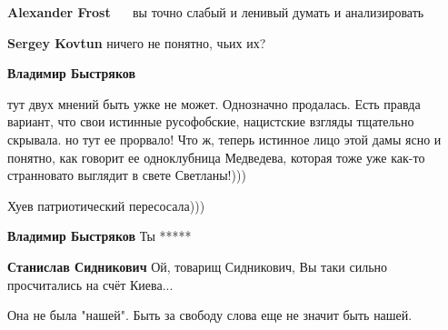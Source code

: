 \begin{itemize}
\begin{itemize}
\textbf{Alexander Frost} 🤣🤣🤣🤣🤣вы точно слабый и ленивый думать и анализировать🤣😎😎😎

 
\textbf{Sergey Kovtun} ничего не понятно, чьих их?

 
\textbf{Владимир Быстряков} 

тут двух мнений быть ужке не может. Однозначно продалась. Есть правда вариант,
что свои истинные русофобские, нацистские взгляды тщательно скрывала. но тут ее
прорвало! Что ж, теперь истинное лицо этой дамы ясно и понятно, как говорит ее
одноклубница Медведева, которая тоже уже как-то странновато выглядит в свете
Светланы!)))


 
Хуев патриотический пересосала)))

 
\textbf{Владимир Быстряков} Ты *****

 
\textbf{Станислав Сидникович} Ой, товарищ Сидникович, Вы таки сильно просчитались на счёт Киева...

 
Она не была "нашей". Быть за свободу слова еще не значит быть нашей.


\end{itemize}
\end{itemize}
